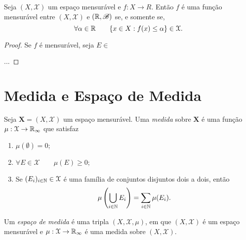\begin{prop}
	Seja $(X,\mathcal X)$ um espaço mensurável e $f: X \to R$. Então $f$ é uma função mensurável entre $(X,\mathcal X)$ e $(\mathbb{R},\mathscr B)$ se, e somente se,
	\begin{equation*}
	\forall \alpha \in \mathbb{R} \qquad \{x \in X : f(x) \leq \alpha\} \in \mathcal X.
	\end{equation*}
\end{prop}
\begin{proof}
	Se $f$ é mensurável, seja $E \in$
	
	...
\end{proof}
\newpage

\section{Medida e Espaço de Medida}

\begin{defi}
	Seja $\bm X=(X,\mathcal X)$ um espaço mensurável. Uma \emph{medida} sobre $\bm X$ é uma função $\mu : \mathcal X \to \mathbb{R}_\infty$ que satisfaz
	\begin{enumerate}
	\item $\mu(\emptyset)=0$;
	\item $\forall E \in \mathcal X \qquad \mu(E) \geq 0$;
	\item Se $(E_i)_{i \in \mathbb{N}} \in \mathcal X$ é uma família de conjuntos disjuntos dois a dois, então
	\begin{equation*}
	\mu\left(\displaystyle\bigcup_{i \in \mathbb{N}} E_i\right)=\displaystyle\sum_{i \in \mathbb{N}} \mu(E_i).
	\end{equation*}
	\end{enumerate}
\end{defi}

\begin{defi}
	Um \emph{espaço de medida} é uma tripla $(X,\mathcal X,\mu)$, em que $(X,\mathcal X)$ é um espaço mensurável e $\mu:\mathcal X \to \mathbb{R}_\infty$ é uma medida sobre $(X,\mathcal X)$.
\end{defi}


